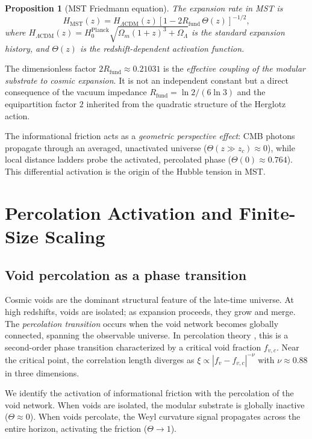\documentclass[12pt,a4paper]{article}
\theoremstyle{plain}
\newtheorem{proposition}[theorem]{Proposition}
\theoremstyle{definition}
\theoremstyle{remark}
\begin{document}
\begin{proposition}[MST Friedmann equation]
\label{prop:Friedmann}
The expansion rate in MST is
\begin{equation}
\boxed{H_{\text{MST}}(z) = H_{\Lambda\text{CDM}}(z) \left[1 - 2R_{\text{fund}}\, \Theta(z)\right]^{-1/2}},
\label{eq:Friedmann}
\end{equation}
where \(H_{\Lambda\text{CDM}}(z) = H_0^{\text{Planck}} \sqrt{\Omega_m(1+z)^3 + \Omega_\Lambda}\) is the standard expansion history, and \(\Theta(z)\) is the redshift-dependent activation function.
\end{proposition}

The dimensionless factor \(2R_{\text{fund}} \approx 0.21031\) is the \emph{effective coupling of the modular substrate to cosmic expansion}. It is not an independent constant but a direct consequence of the vacuum impedance \(R_{\text{fund}} = \ln 2/(6\ln 3)\) and the equipartition factor \(2\) inherited from the quadratic structure of the Herglotz action.

The informational friction acts as a \emph{geometric perspective effect}: CMB photons propagate through an averaged, unactivated universe (\(\Theta(z \gg z_c) \approx 0\)), while local distance ladders probe the activated, percolated phase (\(\Theta(0) \approx 0.764\)). This differential activation is the origin of the Hubble tension in MST.

\section{Percolation Activation and Finite-Size Scaling}
\label{sec:percolation}

\subsection{Void percolation as a phase transition}
Cosmic voids are the dominant structural feature of the late-time universe. At high redshifts, voids are isolated; as expansion proceeds, they grow and merge. The \emph{percolation transition} occurs when the void network becomes globally connected, spanning the observable universe. In percolation theory \cite{Stauffer1994}, this is a second-order phase transition characterized by a critical void fraction \(f_{v,c}\). Near the critical point, the correlation length diverges as \(\xi \propto |f_v - f_{v,c}|^{-\nu}\) with \(\nu \approx 0.88\) in three dimensions.

We identify the activation of informational friction with the percolation of the void network. When voids are isolated, the modular substrate is globally inactive (\(\Theta \approx 0\)). When voids percolate, the Weyl curvature signal propagates across the entire horizon, activating the friction (\(\Theta \to 1\)).
\end{document}
